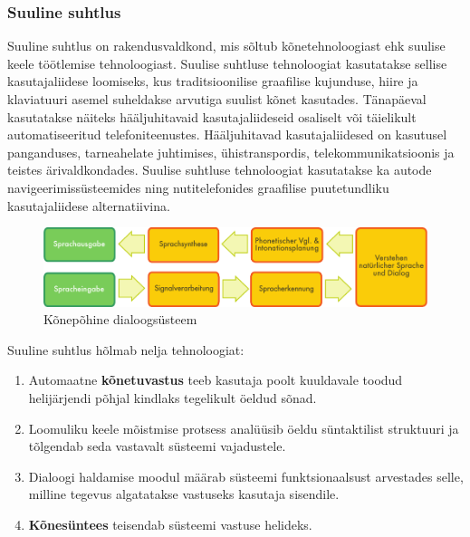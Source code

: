 \documentclass[]{../metanetpaper}
\begin{document}
\begin{multicols}{2}
\subsubsection{Suuline suhtlus}

Suuline suhtlus on rakendusvaldkond, mis sõltub kõnetehnoloogiast ehk suulise keele töötlemise tehnoloogiast. 
Suulise suhtluse tehnoloogiat kasutatakse sellise kasutajaliidese loomiseks, kus traditsioonilise graafilise kujunduse, hiire ja klaviatuuri asemel suheldakse arvutiga suulist kõnet kasutades. 
Tänapäeval kasutatakse näiteks hääljuhitavaid kasutajaliideseid osaliselt või täielikult automatiseeritud telefoniteenustes. 
Hääljuhitavad kasutajaliidesed on kasutusel panganduses, tarneahelate juhtimises, ühistranspordis, telekommunikatsioonis ja teistes ärivaldkondades. 
Suulise suhtluse tehnoloogiat kasutatakse ka autode navigeerimissüsteemides ning nutitelefonides graafilise puutetundliku kasutajaliidese alternatiivina. 



\begin{figure}[htb]
  \center 
  \includegraphics[width=\textwidth]{../_media/german/simple_speech-based_dialogue_architecture}
  \caption{Kõnepõhine dialoogsüsteem}
  \label{fig:dialoguearch_ee}
\end{figure}


Suuline suhtlus hõlmab nelja tehnoloogiat:
   \begin{enumerate}
      \item Automaatne \textbf{kõnetuvastus} teeb kasutaja poolt kuuldavale toodud helijärjendi põhjal kindlaks tegelikult öeldud sõnad.
      \item Loomuliku keele mõistmise protsess ana\-lüüsib öeldu süntaktilist struk\-tuuri ja tõlgendab seda vastavalt süsteemi vajadustele.
      \item Dialoogi haldamise moodul määrab süsteemi funktsionaalsust arvestades selle, milline tegevus algatatakse vastuseks kasutaja sisendile. 
      \item \textbf{Kõnesüntees} teisendab süsteemi vastuse helideks.
    \end{enumerate}


\end{multicols}
\end{document}
